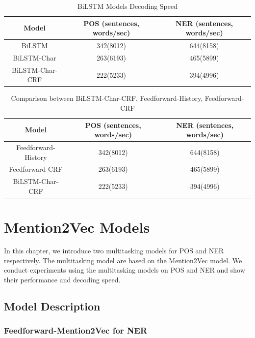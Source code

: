 \documentclass{sfuthesis}
\begin{document}
\begin{table}[]
\centering
\caption{BiLSTM Models Decoding Speed}
\label{table:lstm-table2}
\begin{tabular}{|c|c|c|}
\hline
Model       & POS  (sentences, words/sec)  & NER  (sentences, words/sec)      \\ \hline
BiLSTM             & 342(8012)     & 644(8158)       \\ \hline
BiLSTM-Char        & 263(6193)  & 465(5899)             \\ \hline
BiLSTM-Char-CRF    & 222(5233)  & 394(4996)         \\ \hline
\end{tabular}
\end{table}

\begin{table}[]
\centering
\caption{Comparison between BiLSTM-Char-CRF, Feedforward-History, Feedforward-CRF}
\label{table:lstm-table3}
\begin{tabular}{|c|c|c|}
\hline
Model       & POS  (sentences, words/sec)  & NER  (sentences, words/sec)      \\ \hline
Feedforward-History            & 342(8012)     & 644(8158)       \\ \hline
Feedforward-CRF        & 263(6193)  & 465(5899)             \\ \hline
BiLSTM-Char-CRF    & 222(5233)  & 394(4996)         \\ \hline
\end{tabular}
\end{table}

\chapter{Mention2Vec Models}

In this chapter, we introduce two multitasking models for POS and NER respectively. The multitasking model are based on the Mention2Vec model. We conduct experiments using the multitasking models on POS and NER and show their performance and decoding speed. 

\section{Model Description}

\subsection{Feedforward-Mention2Vec for NER}
\end{document}
